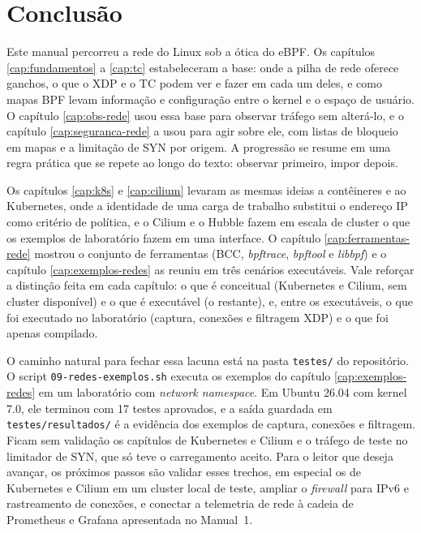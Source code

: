 \chapter{Conclusão}
\label{cap:conclusao-redes}

Este manual percorreu a rede do Linux sob a ótica do eBPF. Os capítulos
\ref{cap:fundamentos} a \ref{cap:tc} estabeleceram a base: onde a pilha de rede
oferece ganchos, o que o XDP e o TC podem ver e fazer em cada um deles, e como mapas
BPF levam informação e configuração entre o kernel e o espaço de usuário. O capítulo
\ref{cap:obs-rede} usou essa base para observar tráfego sem alterá-lo, e o capítulo
\ref{cap:seguranca-rede} a usou para agir sobre ele, com listas de bloqueio em mapas e
a limitação de SYN por origem. A progressão se resume em uma regra prática que se
repete ao longo do texto: observar primeiro, impor depois.

Os capítulos \ref{cap:k8s} e \ref{cap:cilium} levaram as mesmas ideias a contêineres e
ao Kubernetes, onde a identidade de uma carga de trabalho substitui o endereço IP
como critério de política, e o Cilium e o Hubble fazem em escala de cluster o que os
exemplos de laboratório fazem em uma interface. O capítulo \ref{cap:ferramentas-rede}
mostrou o conjunto de ferramentas (BCC, \textit{bpftrace}, \textit{bpftool} e
\textit{libbpf}) e o capítulo \ref{cap:exemplos-redes} as reuniu em três cenários
executáveis. Vale reforçar a distinção feita em cada capítulo: o que é conceitual
(Kubernetes e Cilium, sem cluster disponível) e o que é executável (o restante), e, entre
os executáveis, o que foi executado no laboratório (captura, conexões e filtragem XDP) e o que foi
apenas compilado.

O caminho natural para fechar essa lacuna está na pasta \texttt{testes/} do repositório.
O script \texttt{09-redes-exemplos.sh} executa os exemplos do capítulo
\ref{cap:exemplos-redes} em um laboratório com \textit{network namespace}. Em Ubuntu 26.04 com kernel 7.0, ele terminou com 17 testes
aprovados, e a saída guardada em \texttt{testes/resultados/} é a evidência dos exemplos
de captura, conexões e filtragem. Ficam sem validação os capítulos de Kubernetes e
Cilium e o tráfego de teste no limitador de SYN, que só teve o carregamento aceito. Para o leitor que deseja avançar, os
próximos passos são validar esses trechos, em especial os de Kubernetes e Cilium em um
cluster local de teste, ampliar o \textit{firewall} para IPv6 e rastreamento de conexões, e conectar a
telemetria de rede à cadeia de Prometheus e Grafana apresentada no Manual~1.
